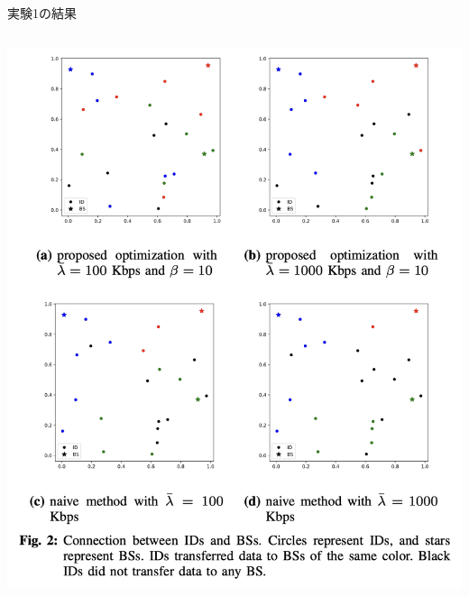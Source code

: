 \documentclass[unicode,12pt,aspectratio=169, dvipdfmx]{beamer}
\begin{document}
\begin{frame}{実験1の結果}
\begin{columns}
\begin{column}[T]{.5\linewidth}
\begin{center}
                    \includegraphics[scale=0.3]{figures/fig-2.png}                    
                \end{center}
                \end{column}
        \end{columns}
    \end{frame}
\end{document}
